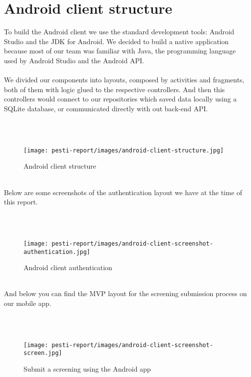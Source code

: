 \section{Android client structure}

To build the Android client we use the standard development tools: Android Studio and the JDK for Android. We decided to build a native application because most of our team was familiar with Java, the programming language used by Android Studio and the Android API.
\\ \\
We divided our components into layouts, composed by activities and fragments, both of them with logic glued to the respective controllers. And then this controllers would connect to our repositories which saved data locally using a SQLite database, or communicated directly with out back-end API.

\\ \\
\begin{figure}[H]
	\centering
	\texttt{[image: pesti-report/images/android-client-structure.jpg]}
	\caption{Android client structure}
	\label{fig:android-client-structure}
\end{figure}
\\

Below are some screenshots of the authentication layout we have at the time of this report.

\\ \\
\begin{figure}[H]
	\centering
	\texttt{[image: pesti-report/images/android-client-screenshot-authentication.jpg]}
	\caption{Android client authentication}
	\label{fig:android-client-authentication}
\end{figure}
\\

And below you can find the MVP layout for the screening submission process on our mobile app.

\\ \\
\begin{figure}[H]
	\centering
	\texttt{[image: pesti-report/images/android-client-screenshot-screen.jpg]}
	\caption{Submit a screening using the Android app}
	\label{fig:android-client-screen}
\end{figure}
\\




